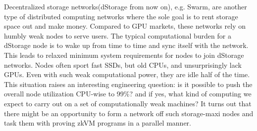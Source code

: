 \documentclass[a4paper, 10pt]{article}
\begin{document}
Decentralized storage networks(dStorage from now on), e.g. Swarm, are another type of distributed computing networks where the sole goal is to rent storage space out and make money. Compared to GPU markets, these networks rely on humbly weak nodes to serve users. The typical computational burden for a dStorage node is to wake up from time to time and sync itself with the network. This leads to relaxed minimum system requirements for nodes to join dStorage networks. Nodes often sport fast SSDs, but old CPUs, and unsurprisingly lack GPUs. Even with such weak computational power, they are idle half of the time. This situation raises an interesting engineering question: is it possible to push the overall node utilization CPU-wise to 99\%? and if yes, what kind of computing we expect to carry out on a set of computationally weak machines? It turns out that there might be an opportunity to form a network off such storage-maxi nodes and task them with proving zkVM programs in a parallel manner.
\end{document}
